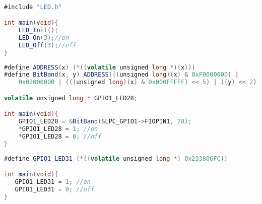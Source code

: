\documentclass[a4paper, 12pt]{article}
\begin{document}
    \begin{lstlisting}[language=Java, caption=Masking Mode]

#include "LED.h"

int main(void){
    LED_Init();
    LED_On(3);//on
    LED_Off(3);//off
}
    \end{lstlisting}
    \begin{lstlisting}[language=Java, caption=Function Mode]
#define ADDRESS(x) (*((volatile unsigned long *)(x)))
#define BitBand(x, y) ADDRESS(((unsigned long)(x) & 0xF0000000) |
    0x02000000 | (((unsigned long)(x) & 0x000FFFFF) << 5) | ((y) << 2))

volatile unsigned long * GPIO1_LED28;

int main(void){
    GPIO1_LED28 = &BitBand(&LPC_GPIO1->FIOPIN1, 28);
    *GPIO1_LED28 = 1; //on
    *GPIO1_LED28 = 0; //off
}
    \end{lstlisting}
    \begin{lstlisting}[language=Java, caption=Bit Banding Mode]
#define GPIO1_LED31 (*((volatile unsigned long *) 0x233806FC))

int main(void){
   GPIO1_LED31 = 1; //on
   GPIO1_LED31 = 0; //off
}
    \end{lstlisting}
\end{document}
